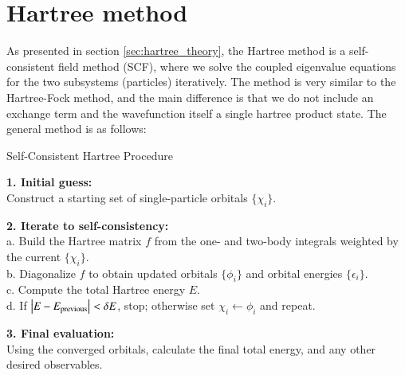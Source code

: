 \documentclass{subfiles}
\begin{document}
\section{Hartree method}\label{sec:Hartree_method}
As presented in section \ref{sec:hartree_theory}, the Hartree method is a self-consistent field method (SCF), where we solve the coupled eigenvalue equations for the two subsystems (particles) iteratively. The method is very similar to the Hartree-Fock method, and the main difference is that we do not include an exchange term and the wavefunction itself a single hartree product state. The general method is as follows:
\begin{algorithm}[ht]
\caption{Self-Consistent Hartree Procedure}
\medskip
\noindent\textbf{1. Initial guess:}\\
\quad Construct a starting set of single-particle orbitals \(\{\chi_i\}\).  

\medskip
\noindent\textbf{2. Iterate to self-consistency:}\\
\quad a. Build the Hartree matrix \(f\) from the one- and two-body integrals weighted by the current \(\{\chi_i\}\).\\
\quad b. Diagonalize \(f\) to obtain updated orbitals \(\{\phi_i\}\) and orbital energies \(\{\epsilon_i\}\).\\
\quad c. Compute the total Hartree energy \(E\).\\
\quad d. If \(\bigl|E - E_{\rm previous}\bigr| < \delta E\), stop; otherwise set \(\chi_i \leftarrow \phi_i\) and repeat.

\medskip
\noindent\textbf{3. Final evaluation:}\\
\quad Using the converged orbitals, calculate the final total energy, and any other desired observables.\label{alg:Hartree}
\end{algorithm}
\end{document}
